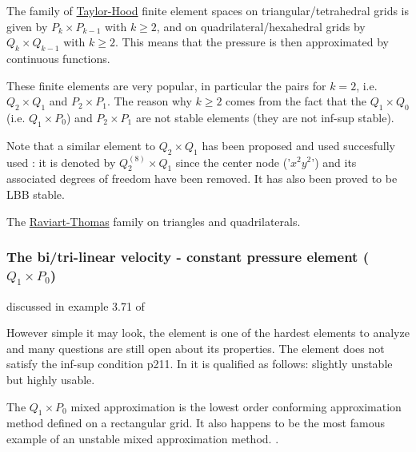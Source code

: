 The family of \underline{Taylor-Hood} finite element spaces on triangular/tetrahedral 
grids is given by $P_k \times P_{k-1}$ with $k\geq 2$, 
and on quadrilateral/hexahedral grids by $Q_k \times Q_{k-1}$ with $k\geq 2$.
This means that the pressure is then approximated by continuous functions. 

These finite elements are very popular, in particular the pairs for $k=2$, i.e.
$Q_2\times Q_1$ and $P_2\times P_1$.
The reason why $k\geq 2$ comes from the fact that the 
$Q_1 \times Q_0$ (i.e. $Q_1 \times P_0$) and $P_2\times P_1$
are not stable elements (they are not inf-sup stable). 

\begin{remark}
Note that a similar element to $Q_2 \times Q_1$ has been proposed
and used succesfully used \cite{taho73,hota74}: it is denoted by $Q_2^{(8)} \times Q_1$ 
since the center node ('$x^2y^2$') and its associated degrees of freedom have been removed. It 
has also been proved to be LBB stable. 
\end{remark}


The \underline{Raviart-Thomas} family on triangles and quadrilaterals.

\subsubsection{The bi/tri-linear velocity - constant pressure element ($Q_1\times P_0$)}

\begin{minipage}[t]{0.5\textwidth}

\end{minipage}
\begin{minipage}[t]{0.5\textwidth}

\end{minipage}

discussed in example 3.71 of \cite{john16}

However simple it may look, the  element is 
one of the hardest elements to analyze and many questions are still open about its properties. 
The element does not satisfy the inf-sup condition \cite{hugh}p211. 
In \cite{grsa} it is qualified as follows: slightly unstable but highly usable. 

The $Q_1 \times P_0$ mixed approximation is the lowest order conforming approximation 
method defined on a rectangular grid. It also happens to be the most famous example 
of an unstable mixed approximation method.
\cite[p235]{elsw}.


